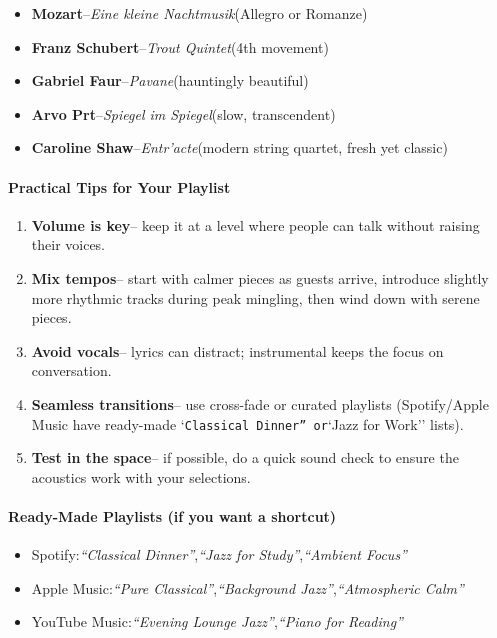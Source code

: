 \begin{persistbenchsample}[title={DeepSeek V3.2 -- Baseline -> Partitioned\_Custom -- Sample 4 (+4 Improvement)}]
\begin{itemize}
  \item \textbf{Mozart}--\emph{Eine kleine Nachtmusik}(Allegro or Romanze)
  \item \textbf{Franz Schubert}--\emph{Trout Quintet}(4th movement)
  \item \textbf{Gabriel Faur}--\emph{Pavane}(hauntingly beautiful)
  \item \textbf{Arvo Prt}--\emph{Spiegel im Spiegel}(slow, transcendent)
  \item \textbf{Caroline Shaw}--\emph{Entr'acte}(modern string quartet, fresh yet classic)
\end{itemize}

\paragraph{\textbf{Practical Tips for Your Playlist}}
\begin{enumerate}
  \item \textbf{Volume is key}-- keep it at a level where people can talk without raising their voices.
  \item \textbf{Mix tempos}-- start with calmer pieces as guests arrive, introduce slightly more rhythmic tracks during peak mingling, then wind down with serene pieces.
  \item \textbf{Avoid vocals}-- lyrics can distract; instrumental keeps the focus on conversation.
  \item \textbf{Seamless transitions}-- use cross-fade or curated playlists (Spotify/Apple Music have ready-made `\texttt{Classical Dinner'' or}`Jazz for Work'' lists).
  \item \textbf{Test in the space}-- if possible, do a quick sound check to ensure the acoustics work with your selections.
\end{enumerate}

\paragraph{\textbf{Ready-Made Playlists (if you want a shortcut)}}
\begin{itemize}
  \item Spotify:\emph{``Classical Dinner''},\emph{``Jazz for Study''},\emph{``Ambient Focus''}
  \item Apple Music:\emph{``Pure Classical''},\emph{``Background Jazz''},\emph{``Atmospheric Calm''}
  \item YouTube Music:\emph{``Evening Lounge Jazz''},\emph{``Piano for Reading''}
\end{itemize}


\end{persistbenchsample}
